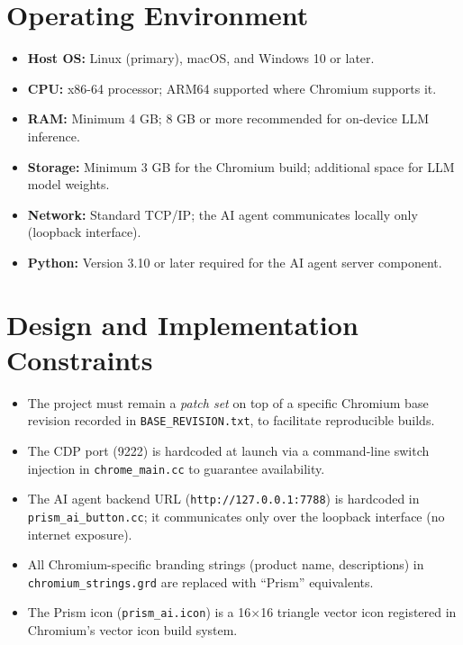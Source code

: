 \section{Operating Environment}
\begin{itemize}[leftmargin=*]
    \item \textbf{Host OS:} Linux (primary), macOS, and Windows 10 or later.
    \item \textbf{CPU:} x86-64 processor; ARM64 supported where Chromium supports it.
    \item \textbf{RAM:} Minimum 4 GB; 8 GB or more recommended for on-device LLM inference.
    \item \textbf{Storage:} Minimum 3 GB for the Chromium build; additional space for LLM model weights.
    \item \textbf{Network:} Standard TCP/IP; the AI agent communicates locally only (loopback interface).
    \item \textbf{Python:} Version 3.10 or later required for the AI agent server component.
\end{itemize}

\section{Design and Implementation Constraints}
\begin{itemize}[leftmargin=*]
    \item The project must remain a \textit{patch set} on top of a specific Chromium base revision recorded in \texttt{BASE\_REVISION.txt}, to facilitate reproducible builds.
    \item The CDP port (9222) is hardcoded at launch via a command-line switch injection in \texttt{chrome\_main.cc} to guarantee availability.
    \item The AI agent backend URL (\texttt{http://127.0.0.1:7788}) is hardcoded in \texttt{prism\_ai\_button.cc}; it communicates only over the loopback interface (no internet exposure).
    \item All Chromium-specific branding strings (product name, descriptions) in \texttt{chromium\_strings.grd} are replaced with ``Prism'' equivalents.
    \item The Prism icon (\texttt{prism\_ai.icon}) is a 16$\times$16 triangle vector icon registered in Chromium's vector icon build system.
\end{itemize}

